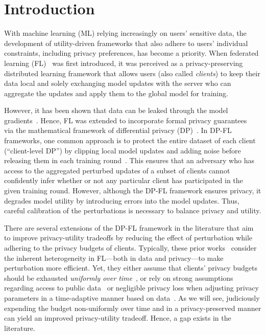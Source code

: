 \section{Introduction}
With machine learning (ML) relying increasingly on users' sensitive data, the development of utility-driven frameworks that also adhere to users' individual constraints, including privacy preferences, has become a priority. When federated learning (FL)~\citep{mcmahan2017communication} was first introduced, it was perceived as a privacy-preserving distributed learning framework that allows users (also called \textit{clients}) to keep their data local and solely exchanging model updates with the server who can aggregate the updates and apply them to the global model for training. 


However, it has been shown that data can be leaked through the model gradients~\citep{zhu2019deep, geiping2020inverting, boenisch2023curious}. Hence, FL was extended to incorporate formal privacy guarantees~\citep{mcmahan2017learning, geyer2017differentially, wei2020federated, hu2023federated, ramaswamy2020training} via the mathematical framework of differential privacy (DP)~\citep{dwork2006differential}. In DP-FL frameworks, one common approach is to protect the entire dataset of each client (``client-level DP'') by clipping local model updates and adding noise before releasing them in each training round~\citep{truex2019hybrid, truex2020ldp}. This ensures that an adversary who has access to the aggregated perturbed updates of a subset of clients cannot confidently infer whether or not any particular client has participated in the given training round. However, although the DP-FL framework ensures privacy, it degrades model utility by introducing errors into the model updates. Thus, careful calibration of the perturbations is necessary to balance privacy and utility. 

There are several extensions of the DP-FL framework in the literature that aim to improve privacy-utility tradeoffs by reducing the effect of perturbation while adhering to the privacy budgets of clients. Typically, these prior works~\citep{pichapati2019adaclip, yang2021federated, shen2023pldp,yang2023dynamic, mcmahan2017learning} consider the inherent heterogeneity in FL—both in data and privacy—to make perturbation more efficient. Yet, they either assume that clients' privacy budgets should be exhausted \textit{uniformly over time}~\citep{boenisch2024have}, or rely on strong assumptions regarding access to public data~\citep{li2022private} or negligible privacy loss when adjusting privacy parameters in a time-adaptive manner based on data~\citep{pichapati2019adaclip}. As we will see, judiciously expending the budget non-uniformly over time and in a privacy-preserved manner can yield an improved privacy-utility tradeoff. Hence, a gap exists in the literature.

